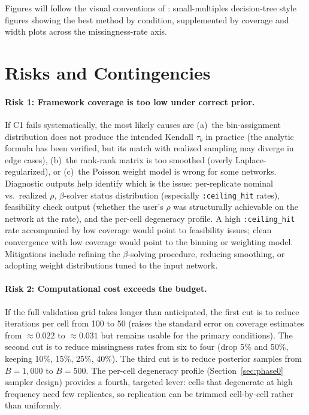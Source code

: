 \documentclass[11pt]{article}
\begin{document}
Figures will follow the visual conventions of \citet{SmithMorganMoody2022}: small-multiples decision-tree style figures showing the best method by condition, supplemented by coverage and width plots across the missingness-rate axis.

\section{Risks and Contingencies}

\paragraph{Risk 1: Framework coverage is too low under correct prior.} If C1 fails systematically, the most likely causes are (a)~the bin-assignment distribution does not produce the intended Kendall $\tau_b$ in practice (the analytic formula has been verified, but its match with realized sampling may diverge in edge cases), (b)~the rank-rank matrix is too smoothed (overly Laplace-regularized), or (c)~the Poisson weight model is wrong for some networks. Diagnostic outputs help identify which is the issue: per-replicate nominal vs.~realized $\rho$, $\beta$-solver status distribution (especially \texttt{:ceiling\_hit} rates), feasibility check output (whether the user's $\rho$ was structurally achievable on the network at the rate), and the per-cell degeneracy profile. A high \texttt{:ceiling\_hit} rate accompanied by low coverage would point to feasibility issues; clean convergence with low coverage would point to the binning or weighting model. Mitigations include refining the $\beta$-solving procedure, reducing smoothing, or adopting weight distributions tuned to the input network.

\paragraph{Risk 2: Computational cost exceeds the budget.} If the full validation grid takes longer than anticipated, the first cut is to reduce iterations per cell from 100 to 50 (raises the standard error on coverage estimates from $\approx 0.022$ to $\approx 0.031$ but remains usable for the primary conditions). The second cut is to reduce missingness rates from six to four (drop 5\% and 50\%, keeping 10\%, 15\%, 25\%, 40\%). The third cut is to reduce posterior samples from $B = 1{,}000$ to $B = 500$. The per-cell degeneracy profile (Section~\ref{sec:phase0} sampler design) provides a fourth, targeted lever: cells that degenerate at high frequency need few replicates, so replication can be trimmed cell-by-cell rather than uniformly.
\end{document}
